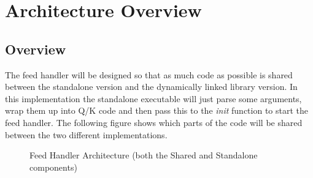 \chapter{Architecture Overview}

\section{Overview}

The feed handler will be designed so that as much code as possible is shared
between the standalone version and the dynamically linked library version.
In this implementation the standalone executable will just parse some arguments,
wrap them up into Q/K code and then pass this to the \textit{init}
function to start the feed handler. The following figure shows which parts of the
code will be shared between the two different implementations.

 \begin{figure}[H]
 	\centering
 	\caption{Feed Handler Architecture (both the Shared and Standalone components)}
 	\label{usingtheinputresourcepage}
 \end{figure}

